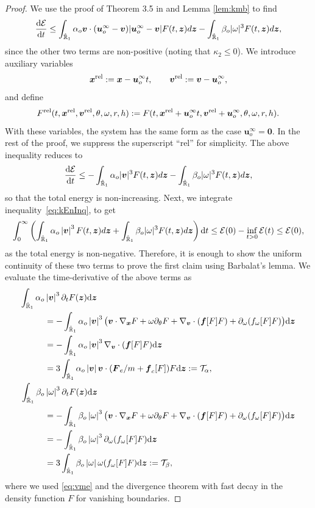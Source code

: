 \documentclass[a4paper,11pt]{article}
\numberwithin{equation}{section}
\theoremstyle{definition}
\newcommand{\bfx}{\boldsymbol{x}}
\newcommand{\bfz}{\boldsymbol{z}}
\newcommand{\bfzr}{\boldsymbol{0}}
\newcommand{\bfv}{\boldsymbol{v}}
\newcommand{\bfu}{\boldsymbol{u}_o}
\newcommand{\bff}{\boldsymbol{f}}
\newcommand{\bfF}{\boldsymbol{F}}
\newcommand{\bbr}{\mathbb R}
\def\d{{  \rm d}}
\newcommand{\T}{\mathcal{T}}
\newcommand{\E}{\mathcal{E}}
\begin{document}
\begin{proof} 
We use the proof of Theorem 3.5 in \cite{deng2025particle} and 
Lemma \ref{lem:kmb} to find 
\begin{equation*}
\frac{\d \E}{\d t}\le\int_{\hat{\bbr}_1}\alpha_o \bfv\cdot(\bfu^\infty-\bfv)|\bfu^{\infty}-\bfv| F(t,\bfz)d\bfz-\int_{\hat{\bbr}_1}\beta_o |\omega|^3 F(t,\bfz)d\bfz,
\end{equation*}
since the other two terms are non-positive (noting that $\kappa_2 \le 0$).
%
We introduce auxiliary variables
\[
\bfx^{\rm rel}:=\bfx-\bfu^\infty t,
\qquad
\bfv^{\rm rel}:=\bfv-\bfu^\infty,
\]
and define
\[
F^{\rm rel}
(t,\bfx^{\rm rel},\bfv^{\rm rel},\theta,\omega,r,h)
:=
F(t,\bfx^{\rm rel}+\bfu^\infty t,
      \bfv^{\rm rel}+\bfu^\infty,\theta,\omega,r,h).
\]
With these variables, the system has the same form as the
case $\bfu^\infty=\bfzr$. In the rest of the proof, we suppress the superscript ``{\rm rel}'' for simplicity.
%
The above inequality reduces to 
\begin{equation}\label{eq:kEnInq}
\frac{\d \E}{\d t}\le-\int_{\hat{\bbr}_1}\alpha_o |\bfv|^3 F(t,\bfz)d\bfz-\int_{\hat{\bbr}_1}\beta_o |\omega|^3 F(t,\bfz)d\bfz,
\end{equation}
so that the total energy is non-increasing.
Next, we integrate inequality~\eqref{eq:kEnInq}, to get
\[
\int_0^\infty \left(\int_{\hat{\bbr}_1}  \alpha_o \left| \bfv \right|^3 F(t, \bfz)  d \bfz   +  \int_{\hat{\bbr}_1} \beta_o  |\omega|^3  F(t, \bfz)  d \bfz\right)\d t\le \E(0)-\inf_{t>0} \E(t)\le \E(0),
\]
as the total energy is non-negative.
Therefore, it is enough to show the uniform continuity of these two terms to prove the first claim using Barbalat's lemma.
We evaluate the time-derivative of the above terms as
\begin{align*}
\int_{\hat{\bbr}_1}\alpha_o & \left| \bfv \right|^3 \partial_t F(\bfz)  \d \bfz \\
& = -\int_{\hat{\bbr}_1}\alpha_o\left| \bfv \right|^3 \big( \bfv  \cdot \nabla_{\bfx} F + \omega \partial_\theta F +  \nabla_{\bfv} \cdot (\bff[F] F) +  \partial_{\omega} (f_{\omega}[F] F) \big) \d \bfz  \\
& = -\int_{\hat{\bbr}_1}\alpha_o\left| \bfv \right|^3  \nabla_{\bfv} \cdot (\bff[F] F)  \d \bfz  \\
%
& =  
3\int_{\hat{\bbr}_1}\alpha_o\left|\bfv \right| \bfv \cdot (\bfF_e/m +\bff_c [F])F  \d \bfz := \T_\alpha,\\
%
%
\int_{\hat{\bbr}_1}\beta_o & \left| \omega \right|^3 \partial_t F(\bfz)  \d \bfz \\
& = -\int_{\hat{\bbr}_1}\beta_o\left| \omega \right|^3 \big( \bfv  \cdot \nabla_{\bfx} F + \omega \partial_\theta F +  \nabla_{\bfv} \cdot (\bff[F] F) +  \partial_{\omega} (f_{\omega}[F] F) \big) \d \bfz  \\
& = -\int_{\hat{\bbr}_1}\beta_o\left| \omega \right|^3  \partial_{\omega} (f_{\omega}[F] F) \d \bfz  \\
& = 3\int_{\hat{\bbr}_1}\beta_o\left| \omega \right| \omega (f_{\omega}[F] F) \d \bfz  := \T_\beta,
\end{align*}
where we used \eqref{eq:vme} and the divergence theorem with fast decay in the density function $F$ for vanishing boundaries. 


\end{proof}
\end{document}
